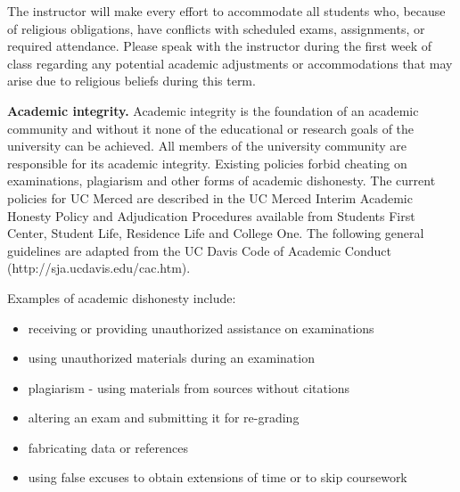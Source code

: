 \documentclass{article}
\begin{document}
The instructor will make every effort to accommodate all students who,
because of religious obligations, have conflicts with scheduled exams,
assignments, or required attendance.  Please speak with the instructor
during the first week of class regarding any potential academic
adjustments or accommodations that may arise due to religious beliefs
during this term.

\textbf{Academic integrity.}  Academic integrity is the foundation of
an academic community and without it none of the educational or
research goals of the university can be achieved.  All members of the
university community are responsible for its academic integrity.
Existing policies forbid cheating on examinations, plagiarism and
other forms of academic dishonesty.  The current policies for UC
Merced are described in the UC Merced Interim Academic Honesty Policy
and Adjudication Procedures available from Students First Center,
Student Life, Residence Life and College One.  The following general
guidelines are adapted from the UC Davis Code of Academic Conduct
(http://sja.ucdavis.edu/cac.htm).

Examples of academic dishonesty include:
\begin{itemize}

\item receiving or providing unauthorized assistance on examinations

\item using unauthorized materials during an examination

\item plagiarism - using materials from sources without citations

\item altering an exam and submitting it for re-grading

\item fabricating data or references

\item using false excuses to obtain extensions of time or to skip
  coursework

\end{itemize}
\end{document}
